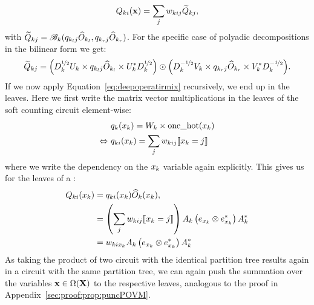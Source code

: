 \begin{align}
	Q_{ki}(\mathbf{x}) = \sum_j w_{kij}  \widetilde{Q}_{kj},
\end{align}
with $ \widetilde{Q}_{kj} = \mathscr{B}_k(  q_{k_l j} \widehat{O}_{k_l},  q_{k_r j} \widehat{O}_{k_r} )$. For the specific case of polyadic decompositions in the bilinear form we get:
\begin{align}
	\widetilde{Q}_{kj}
	=
	\Bigl(
	D_k^{\nicefrac{1}{2}} U_{k} \times  q_{k_l j} \widehat{O}_{k_l} \times U_{k}^* D_k^{\nicefrac{1}{2}}
	\Bigr)
	\odot
	\Bigl(
	D_k^{-\nicefrac{1}{2}} V_{k} \times q_{k_r j} \widehat{O}_{k_r} \times  V_{k}^* D_k^{-\nicefrac{1}{2}}
	\Bigr).
\end{align}
If we now apply Equation~\ref{eq:deepoperatirmix} recursively, we end up in the leaves. Here we first write the matrix vector multiplications in the leaves of the soft counting circuit element-wise:
\begin{align}
	                & \
	q_{k}(x_k) = W_k \times  \text{one\_hot}(x_k)
	\nonumber
	\\
	\Leftrightarrow & \
	q_{ki}(x_k) = \sum_j w_{kij} \llbracket x_k=j\rrbracket
\end{align}
where we write the dependency on the $x_k$ variable again explicitly. This gives us for the leaves of a \noisepunc:
\begin{align}
	Q_{ki}(x_k)
	 & = q_{ki}(x_k)  \widehat{O}_{k}(x_k),
	\nonumber
	\\
	 & = \left( \sum_j w_{kij} \llbracket x_k=j\rrbracket \right)
	A_k \left( e_{x_k} \otimes e_{x_k}^* \right) A_k^*
	\nonumber
	\\
	 & = w_{ki x_k} A_k \left( e_{x_k} \otimes e_{x_k}^* \right) A_k^*
\end{align}
As taking the product of two circuit with the identical partition tree results again in a circuit with the same partition tree, we can again push the summation over the variables $\mathbf{x}\in \Omega(\mathbf{X})$ to the respective leaves, analogous to the proof in Appendix~\ref{sec:proof:prop:puncPOVM}.


